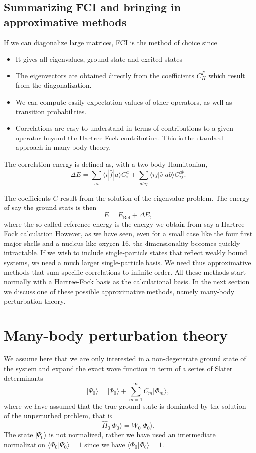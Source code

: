 \subsection{Summarizing FCI and bringing in approximative methods}


If we can diagonalize large matrices, FCI is the method of choice since
\begin{itemize}
\item It gives all eigenvalues, ground state and excited states.

\item The eigenvectors are obtained directly from the coefficients $C_H^P$ which result from the diagonalization.

\item We can compute easily expectation values of other operators, as well as transition probabilities.

\item Correlations are easy to understand in terms of contributions to a given operator beyond the Hartree-Fock contribution. This is the standard approach in  many-body theory. 
\end{itemize}

The correlation energy is defined as, with a two-body Hamiltonian,  
\[
\Delta E=\sum_{ai}\langle i| \hat{f}|a \rangle C_{i}^{a}+
\sum_{abij}\langle ij | \hat{v}| ab \rangle C_{ij}^{ab}.
\]

The coefficients $C$ result from the solution of the eigenvalue problem. 
The energy of say the ground state is then
\[
E=E_{\mathrm{Ref}}+\Delta E,
\]
where the so-called reference energy is the energy we obtain from say a Hartree-Fock calculation
However, as we have seen, even for a small case like the four first major shells and a nucleus like oxygen-16, the dimensionality becomes quickly intractable. If we wish to include single-particle states that reflect weakly bound systems, we need a much larger single-particle basis. We need thus approximative methods that sum specific correlations to infinite order. 
All these methods start normally with a Hartree-Fock basis as the calculational basis. In the next section we discuss one of these possible approximative methods, namely many-body perturbation theory. 

\section{Many-body perturbation theory}

We assume here that we are only interested in a non-degenerate ground state of the system and 
expand the exact wave function in term of a series of Slater determinants
\[
\vert \Psi_0\rangle = \vert \Phi_0\rangle + \sum_{m=1}^{\infty}C_m\vert \Phi_m\rangle,
\]
where we have assumed that the true ground state is dominated by the 
solution of the unperturbed problem, that is
\[
\hat{H}_0\vert \Phi_0\rangle= W_0\vert \Phi_0\rangle.
\]
The state $\vert \Psi_0\rangle$ is not normalized, rather we have used an intermediate 
normalization $\langle \Phi_0 \vert \Psi_0\rangle=1$ since we have $\langle \Phi_0\vert \Phi_0\rangle=1$. 



